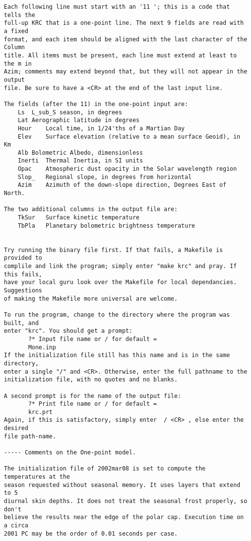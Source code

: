 \begin{verbatim}
Each following line must start with an '11 '; this is a code that tells the
full-up KRC that is a one-point line. The next 9 fields are read with a fixed
format, and each item should be aligned with the last character of the Column
title. All items must be present, each line must extend at least to the m in
Azim; comments may extend beyond that, but they will not appear in the output
file. Be sure to have a <CR> at the end of the last input line.

The fields (after the 11) in the one-point input are:
	Ls 	L_sub_S season, in degrees
	Lat	Aerographic latitude in degrees
	Hour	Local time, in 1/24'ths of a Martian Day
	Elev	Surface elevation (relative to a mean surface Geoid), in Km
	Alb	Bolometric Albedo, dimensionless
	Inerti	Thermal Inertia, in SI units
	Opac	Atmospheric dust opacity in the Solar wavelength region
	Slop_	Regional slope, in degrees from horizontal
	Azim	Azimuth of the down-slope direction, Degrees East of North.

The two additional columns in the output file are:
  	TkSur	Surface kinetic temperature
	TbPla	Planetary bolometric brightness temperature


Try running the binary file first. If that fails, a Makefile is provided to
complile and link the program; simply enter "make krc" and pray. If this fails,
have your local guru look over the Makefile for local dependancies. Suggestions
of making the Makefile more universal are welcome.

To run the program, change to the directory where the program was built, and
enter "krc". You should get a prompt:
       ?* Input file name or / for default =
       Mone.inp                         
If the initialization file still has this name and is in the same directory,
enter a single "/" and <CR>. Otherwise, enter the full pathname to the 
initialization file, with no quotes and no blanks.

A second prompt is for the name of the output file: 
       ?* Print file name or / for default =
       krc.prt     
Again, if this is satisfactory, simply enter  / <CR> , else enter the desired
file path-name.

----- Comments on the One-point model. 

The initialization file of 2002mar08 is set to compute the temperatures at the
season requested without seasonal memory. It uses layers that extend to 5
diurnal skin depths. It does not treat the seasonal frost properly, so don't
believe the results near the edge of the polar cap. Execution time on a circa
2001 PC may be the order of 0.01 seconds per case.


\end{verbatim}
